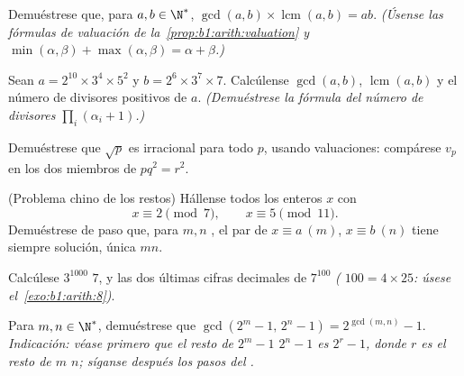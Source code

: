 \begin{exercise}[$\star\star$]\label{exo:b1:arith:5}
Demuéstrese que, para $a, b \in \N^*$, $\gcd(a,b) \times
\operatorname{lcm}(a,b) = ab$. \emph{(Úsense las fórmulas de
valuación de la~\cref{prop:b1:arith:valuation} y
$\min(\alpha,\beta) + \max(\alpha,\beta) = \alpha + \beta$.)}
\end{exercise}

\begin{exercise}[$\star\star$]\label{exo:b1:arith:6}
Sean $a = 2^{10} \times 3^4 \times 5^2$ y $b = 2^6 \times 3^7 \times
7$. Calcúlense $\gcd(a, b)$, $\operatorname{lcm}(a,b)$ y el número de
divisores positivos de $a$. \emph{(Demuéstrese la fórmula del número
de divisores $\prod_i (\alpha_i + 1)$.)}
\end{exercise}

\begin{exercise}[$\star\star$]\label{exo:b1:arith:7}
Demuéstrese que $\sqrt p$ es irracional para todo  $p$, usando
valuaciones: compárese $v_p$ en los dos miembros de $p q^2 = r^2$.
\end{exercise}

\begin{exercise}[$\star\star$]\label{exo:b1:arith:8}
(Problema chino de los restos) Hállense todos los enteros $x$ con
\[
x \equiv 2 \pmod 7, \qquad x \equiv 5 \pmod{11}.
\]
Demuéstrese de paso que, para $m, n$ , el par de
 $x \equiv a \ (m)$, $x \equiv b\ (n)$ tiene siempre
solución, única  $mn$.
\end{exercise}

\begin{exercise}[$\star\star$]\label{exo:b1:arith:9}
Calcúlese $3^{1000}$  $7$, y las dos últimas cifras decimales de
$7^{100}$ \emph{( $100 = 4 \times 25$: úsese
el~\cref{exo:b1:arith:8})}.
\end{exercise}

\begin{exercise}[$\star\star\star$]\label{exo:b1:arith:10}
Para $m, n \in \N^*$, demuéstrese que $\gcd(2^m - 1,\, 2^n - 1) =
2^{\gcd(m,n)} - 1$. \emph{Indicación: véase primero que el resto de
$2^m - 1$  $2^n - 1$ es $2^r - 1$, donde $r$ es el resto de $m$
 $n$; síganse después los pasos del .}
\end{exercise}

